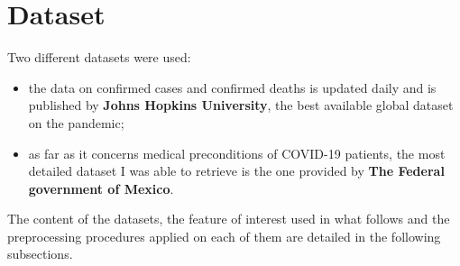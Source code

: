 \documentclass[11pt,a4paper]{article}
\begin{document}
\newpage
\section{Dataset}
Two different datasets were used:
\begin{itemize}
    \item the data on confirmed cases and confirmed deaths is updated daily and
    is published by \textbf{Johns Hopkins University}, the best available global
    dataset on the pandemic;
    \item as far as it concerns medical preconditions of COVID-19 patients,
    the most detailed dataset I was able to retrieve is the one provided by
    \textbf{The Federal government of Mexico}.
\end{itemize}
The content of the datasets, the feature of interest used in what follows and
the preprocessing procedures applied on each of them are detailed in the
following subsections.
\end{document}
